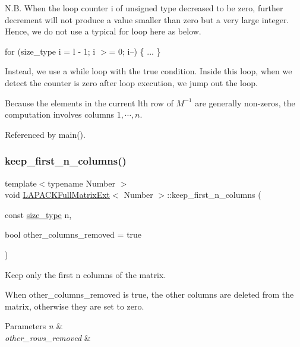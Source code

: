 N.\+B. When the loop counter {\ttfamily i} of {\ttfamily unsigned} type decreased to be zero, further decrement will not produce a value smaller than zero but a very large integer. Hence, we do not use a typical {\ttfamily for} loop here as below.

{\ttfamily  for (size\+\_\+type i = l -\/ 1; i $>$= 0; i--) \{ ... \} }

Instead, we use a {\ttfamily while} loop with the {\ttfamily true} condition. Inside this loop, when we detect the counter is zero after loop execution, we jump out the loop.

Because the elements in the current l\textquotesingle{}th row of $M^{-1}$ are generally non-\/zeros, the computation involves columns $1, \cdots, n$.

Referenced by main().

\mbox{\label{classLAPACKFullMatrixExt_a9c94fd182607dca5b2aa56bca4eb0523}} 
\subsubsection{\texorpdfstring{keep\+\_\+first\+\_\+n\+\_\+columns()}{keep\_first\_n\_columns()}}
{\footnotesize\ttfamily template$<$typename Number $>$ \\
void \hyperlink{classLAPACKFullMatrixExt}{L\+A\+P\+A\+C\+K\+Full\+Matrix\+Ext}$<$ Number $>$\+::keep\+\_\+first\+\_\+n\+\_\+columns (\begin{DoxyParamCaption}\item[{const \hyperlink{classLAPACKFullMatrixExt_a5cf5f4a6104dc17029210b5ca52bf574}{size\+\_\+type}}]{n,  }\item[{bool}]{other\+\_\+columns\+\_\+removed = {\ttfamily true} }\end{DoxyParamCaption})}

Keep only the first n columns of the matrix.

When {\ttfamily other\+\_\+columns\+\_\+removed} is true, the other columns are deleted from the matrix, otherwise they are set to zero.


\begin{DoxyParams}{Parameters}
{\em n} & \\
\hline
{\em other\+\_\+rows\+\_\+removed} & \\
\hline
\end{DoxyParams}


